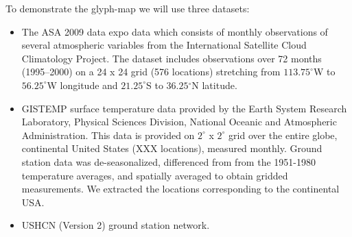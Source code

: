 \documentclass[oneside]{article}
\begin{document}
To demonstrate the glyph-map we will use three datasets:

\begin{itemize}

  \item The ASA 2009 data expo data which consists of monthly observations of
  several atmospheric variables from the International Satellite Cloud
  Climatology Project. The dataset includes observations over 72 months
  (1995--2000) on a 24 x 24 grid (576 locations) stretching from
  $113.75^{\circ}$W to $56.25^{\circ}$W longitude and $21.25^{\circ}$S to
  $36.25{^\circ}$N latitude.

\item GISTEMP surface temperature data provided by the Earth System
  Research Laboratory, Physical Sciences Division, National Oceanic
  and Atmospheric Administration. This data is provided on $2^{\circ}$
  x $2^{\circ}$ grid over the entire globe, continental United States
  (XXX locations), measured monthly.  Ground station data was
  de-seasonalized, differenced from from the 1951-1980 temperature
  averages, and spatially averaged to obtain gridded measurements. We
  extracted the locations corresponding to the continental USA.

  \item USHCN (Version 2) ground station network.
  
\end{itemize}
\end{document}
